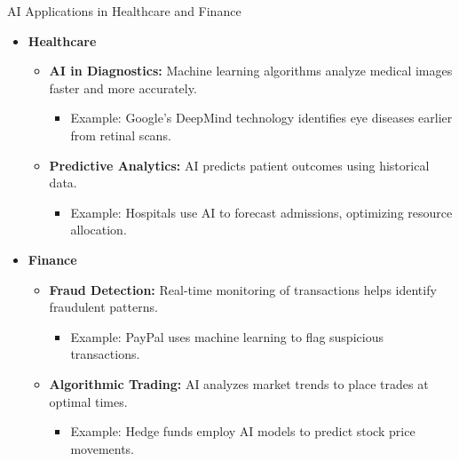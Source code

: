\documentclass[aspectratio=169]{beamer}
\begin{document}
\begin{frame}[fragile]{AI Applications in Healthcare and Finance}
    \begin{itemize}
        \item \textbf{Healthcare}
            \begin{itemize}
                \item \textbf{AI in Diagnostics:} Machine learning algorithms analyze medical images faster and more accurately.
                    \begin{itemize}
                        \item Example: Google’s DeepMind technology identifies eye diseases earlier from retinal scans.
                    \end{itemize}
                \item \textbf{Predictive Analytics:} AI predicts patient outcomes using historical data.
                    \begin{itemize}
                        \item Example: Hospitals use AI to forecast admissions, optimizing resource allocation.
                    \end{itemize}
            \end{itemize}
        \item \textbf{Finance}
            \begin{itemize}
                \item \textbf{Fraud Detection:} Real-time monitoring of transactions helps identify fraudulent patterns.
                    \begin{itemize}
                        \item Example: PayPal uses machine learning to flag suspicious transactions.
                    \end{itemize}
                \item \textbf{Algorithmic Trading:} AI analyzes market trends to place trades at optimal times.
                    \begin{itemize}
                        \item Example: Hedge funds employ AI models to predict stock price movements.
                    \end{itemize}
            \end{itemize}
    \end{itemize}
\end{frame}
\end{document}
